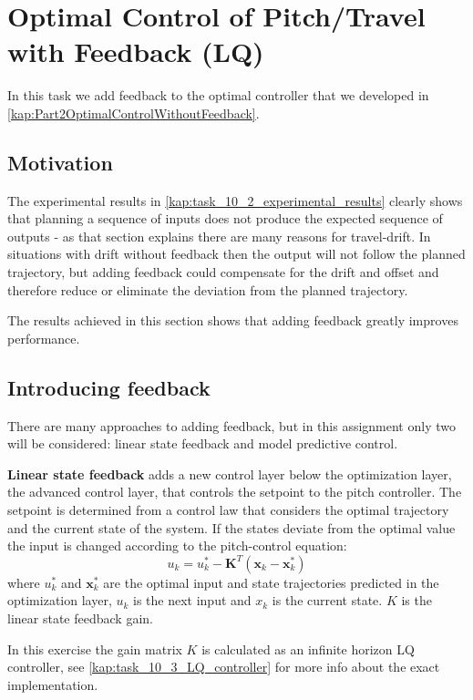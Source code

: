 \documentclass[../main.tex]{subfiles}
\begin{document}
\section{Optimal Control of Pitch/Travel with Feedback (LQ)}
In this task we add feedback to the optimal controller that we developed in \cref{kap:Part2OptimalControlWithoutFeedback}.

\subsection{Motivation}
The experimental results in \cref{kap:task_10_2_experimental_results} clearly shows that planning a sequence of inputs does not produce the expected sequence of outputs - as that section explains there are many reasons for travel-drift. In situations with drift without feedback then the output will not follow the planned trajectory, but adding feedback could compensate for the drift and offset and therefore reduce or eliminate the deviation from the planned trajectory.

The results achieved in this section shows that adding feedback greatly improves performance.

\subsection{Introducing feedback}
There are many approaches to adding feedback, but in this assignment only two will be considered: linear state feedback and model predictive control.

\textbf{Linear state feedback} adds a new control layer below the optimization layer, the advanced control layer, that controls the setpoint to the pitch controller. The setpoint is determined from a control law that considers the optimal trajectory and the current state of the system. If the states deviate from the optimal value the input is changed according to the pitch-control equation:
\begin{equation}\label{eq:lab3_feedback}
	u_k = u_k^* - \bm{K}^T(\bm x_k - \bm x_k^*)
\end{equation}
where $u_k^*$ and $\bm x_k^*$ are the optimal input and state trajectories predicted in the optimization layer, $u_k$ is the next input and $x_k$ is the current state. $K$ is the linear state feedback gain. 

In this exercise the gain matrix $K$ is calculated as an infinite horizon LQ controller, see \cref{kap:task_10_3_LQ_controller} for more info about the exact implementation.
\end{document}
